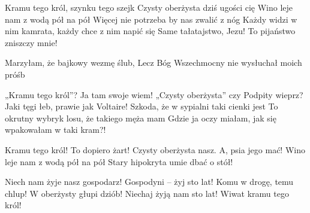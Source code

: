 \documentclass[../../../songbook.tex]{subfiles}
\begin{document}
{\-\hspace{1cm} Kramu tego król, szynku tego szejk			 \newline			
\-\hspace{1cm} Czysty oberżysta dziś ugości cię				 \newline			
\-\hspace{1cm} Wino leje nam z wodą pół na pół				 \newline		
\-\hspace{1cm} Więcej nie potrzeba by nas zwalić z nóg				 \newline		
\-\hspace{1cm} Każdy widzi w nim kamrata, każdy chce z nim napić się				 \newline
\-\hspace{1cm} Same tałatajstwo, Jezu! To pijaństwo zniszczy mnie!			 \newline

Marzyłam, że bajkowy wezmę ślub,				 \newline
Lecz Bóg Wszechmocny nie wysłuchał moich próśb	 \newline

„Kramu tego król”? Ja tam swoje wiem!					 \newline
„Czysty oberżysta” czy Podpity wieprz?					 \newline
Jaki tęgi łeb, prawie jak Voltaire!						 \newline
Szkoda, że w sypialni taki cienki jest					 \newline
To okrutny wybryk losu, że takiego męża mam				 \newline
Gdzie ja oczy miałam, jak się wpakowałam w taki kram?!	 \newline

Kramu tego król! To dopiero żart!		 \newline
Czysty oberżysta nasz. A, psia jego mać!		 \newline
Wino leje nam z wodą pół na pół			 \newline
Stary hipokryta umie dbać o stół!		 \newline

Niech nam żyje nasz gospodarz! Gospodyni – żyj sto lat!		 \newline
Komu w drogę, temu chlup! W oberżysty głupi dziób!			 \newline
Niechaj żyją nam sto lat! Wiwat kramu tego król! 			 \newline
}
\end{document}

